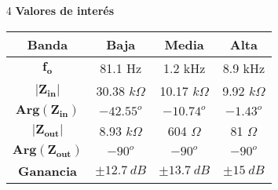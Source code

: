 \begin{multicols}{2}
\begin{enumerate}
	\item[4] \textbf{Valores de interés}
	\begin{table}[H]
		\begin{tabular}{cccc}
			\hline
			\textbf{Banda} & \textbf{Baja} & \textbf{Media} & \textbf{Alta} \\
			\hline			
			$\mathbf{f_{o}}$ & 81.1 Hz & 1.2 kHz & 8.9 kHz \\
			$\mathbf{|Z_{in}|}$ & 30.38 $k\Omega$ & 10.17 $k\Omega$ & 9.92 $k\Omega$ \\
			$\mathbf{Arg\left(Z_{in}\right)}$ & $-42.55^o$ & $-10.74^o$ & $-1.43^o$ \\
			$\mathbf{|Z_{out}|}$ & 8.93 $k\Omega$ & 604 $\Omega$ & 81 $\Omega$ \\
			$\mathbf{Arg\left(Z_{out}\right)}$ & $-90^o$ & $-90^o$ & $-90^o$ \\
			\textbf{Ganancia} & $\pm 12.7 \ dB$ & $\pm 13.7 \ dB$ & $\pm 15 \ dB$ \\
			\hline
		\end{tabular}
	\end{table}

\end{enumerate}
\end{multicols}

%
%
 

